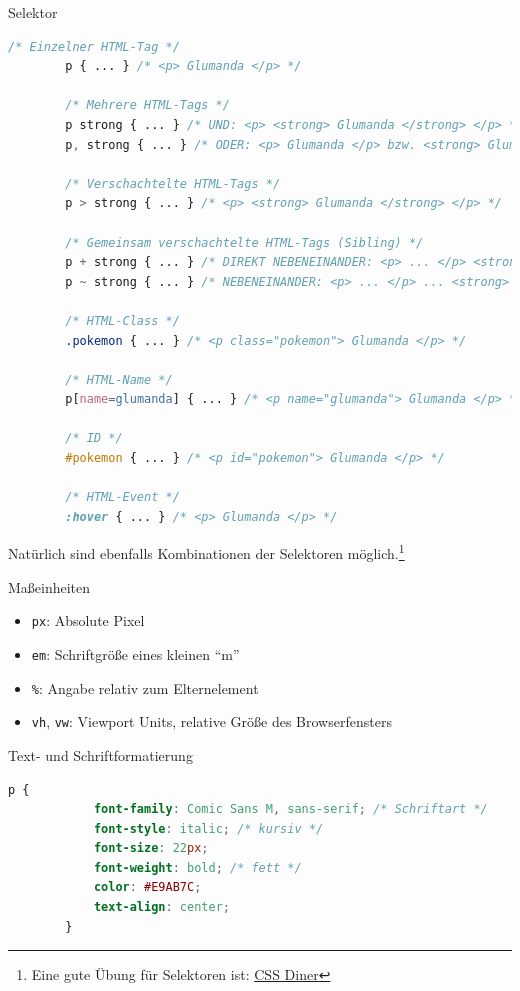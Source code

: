 \begin{example}{Selektor}
    \begin{lstlisting}[language=CSS]
        /* Einzelner HTML-Tag */
        p { ... } /* <p> Glumanda </p> */

        /* Mehrere HTML-Tags */
        p strong { ... } /* UND: <p> <strong> Glumanda </strong> </p> */
        p, strong { ... } /* ODER: <p> Glumanda </p> bzw. <strong> Glumanda </strong> */

        /* Verschachtelte HTML-Tags */
        p > strong { ... } /* <p> <strong> Glumanda </strong> </p> */

        /* Gemeinsam verschachtelte HTML-Tags (Sibling) */
        p + strong { ... } /* DIREKT NEBENEINANDER: <p> ... </p> <strong> Glumanda </strong> */
        p ~ strong { ... } /* NEBENEINANDER: <p> ... </p> ... <strong> Glumanda </strong> */
        
        /* HTML-Class */
        .pokemon { ... } /* <p class="pokemon"> Glumanda </p> */

        /* HTML-Name */
        p[name=glumanda] { ... } /* <p name="glumanda"> Glumanda </p> */

        /* ID */
        #pokemon { ... } /* <p id="pokemon"> Glumanda </p> */

        /* HTML-Event */
        :hover { ... } /* <p> Glumanda </p> */
    \end{lstlisting}

    Natürlich sind ebenfalls Kombinationen der Selektoren möglich.\footnote{Eine gute Übung für Selektoren ist: \href{https://flukeout.github.io/}{CSS Diner}}
\end{example}

\begin{bonus}{Maßeinheiten}
    \begin{itemize}
        \item \texttt{px}: Absolute Pixel
        \item \texttt{em}: Schriftgröße eines kleinen \enquote{m}
        \item \texttt{\%}: Angabe relativ zum Elternelement
        \item \texttt{vh}, \texttt{vw}: Viewport Units, relative Größe des Browserfensters
    \end{itemize}
\end{bonus}

\begin{bonus}{Text- und Schriftformatierung}
    \begin{lstlisting}[language=CSS]
        p {
            font-family: Comic Sans M, sans-serif; /* Schriftart */
            font-style: italic; /* kursiv */
            font-size: 22px; 
            font-weight: bold; /* fett */
            color: #E9AB7C; 
            text-align: center; 
        }
    \end{lstlisting}
\end{bonus}

